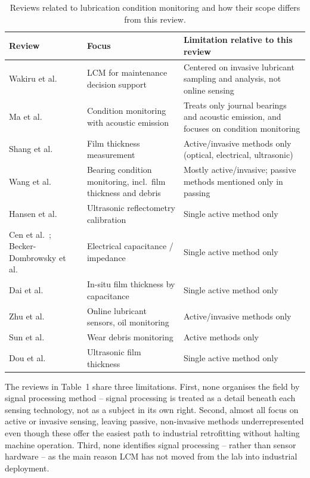 \begin{table}[H]
\small
\centering
\renewcommand{\arraystretch}{1.3}
\begin{tabularx}{\linewidth}{ >{\raggedright\arraybackslash}p{3.2cm} >{\raggedright\arraybackslash}p{4cm} >{\raggedright\arraybackslash}X }
\hline
\textbf{Review} & \textbf{Focus} & \textbf{Limitation relative to this review} \\
\hline
Wakiru et al.\ \cite{wakiru_review_2019} & LCM for maintenance decision support & Centered on 
invasive lubricant sampling and analysis, not online sensing \\
Ma et al. \ \cite{ma_review_2025} & Condition monitoring with acoustic emission & Treats only journal bearings and acoustic emission, and focuses on condition monitoring \\
Shang et al.\ \cite{shang_comprehensive_2024} & Film thickness measurement & Active/invasive methods only (optical, electrical, ultrasonic) \\
Wang et al.\ \cite{wang_advanced_2024} & Bearing condition monitoring, incl.\ film thickness and debris & Mostly active/invasive; passive methods mentioned only in passing \\
Hansen et al.\ \cite{hansen_comparison_2022} & Ultrasonic reflectometry calibration & Single active method only \\
Cen et al.\ \cite{cen_ehl_2021}; Becker-Dombrowsky et al.\ \cite{becker-dombrowsky_electrical_2024} & Electrical capacitance / impedance & Single active method only \\
Dai et al.\ \cite{dai_situ_2024} & In-situ film thickness by capacitance & Single active method only \\
Zhu et al.\ \cite{zhu_lubricating_2017,zhu_survey_2013} & Online lubricant sensors, oil monitoring & Active/invasive methods only \\
Sun et al.\ \cite{sun_online_2021} & Wear debris monitoring & Active methods only \\
Dou et al.\ \cite{dou_review_2022} & Ultrasonic film thickness & Single active method only \\
\hline
\end{tabularx}
\caption{Reviews related to lubrication condition monitoring and how their scope differs from this review.}
\label{tab:existing_reviews}
\end{table}

The reviews in Table~1 share three limitations. First, none organises the field by signal processing method -- signal processing is treated as a detail beneath each sensing technology, not as a subject in its own right. Second, almost all focus on active or invasive sensing, leaving passive, non-invasive methods underrepresented even though these offer the easiest path to industrial retrofitting without halting machine operation. Third, none identifies signal processing -- rather than sensor hardware -- as the main reason LCM has not moved from the lab into industrial deployment.

